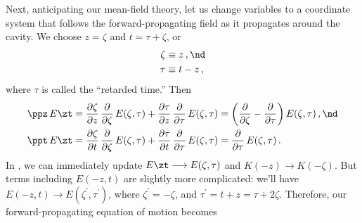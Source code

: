 Next, anticipating our mean-field theory, let us change variables to a coordinate system that follows the forward-propagating field as it propagates around the cavity. We choose $z = \zeta$ and $t = \tau + \zeta$, or
\begin{subequations}
    \begin{align}
        \zeta &\equiv z\, , \nd \\
        \tau &\equiv t - z\, ,
    \end{align}
\end{subequations}
where $\tau$ is called the ``retarded time.'' Then
\begin{subequations}
    \begin{align}
        \ppz\, E\zt &= \frac{\partial \zeta}{\partial z}\, \frac{\partial}{\partial \zeta}\, E(\zeta, \tau) + \frac{\partial \tau}{\partial z}\, \frac{\partial}{\partial \tau}\, E(\zeta, \tau) = \left(\frac{\partial}{\partial \zeta} - \frac{\partial}{\partial \tau}\right) E(\zeta, \tau)\, , \nd \\
        \ppt\, E\zt &= \frac{\partial \zeta}{\partial t}\, \frac{\partial}{\partial \zeta}\, E(\zeta, \tau) + \frac{\partial \tau}{\partial t}\, \frac{\partial}{\partial \tau}\, E(\zeta, \tau) = \frac{\partial}{\partial \tau}\, E(\zeta, \tau)\, .
    \end{align}
\end{subequations}
In , we can immediately update $E\zt \longrightarrow E(\zeta, \tau)$ and $K(-z) \longrightarrow K(-\zeta)$. But terms including $E(-z, t)$ are slightly more complicated: we'll have $E(-z, t) \longrightarrow E(\zeta^\prime, \tau^\prime)$, where $\zeta^\prime = -\zeta$, and $\tau^\prime = t + z = \tau + 2 \zeta$. Therefore, our forward-propagating equation of motion becomes
